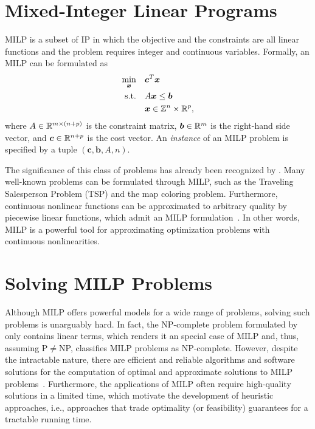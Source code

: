 \section{Mixed-Integer Linear Programs}

MILP is a subset of IP in which the objective and the constraints are all linear functions and the problem requires integer and continuous variables.
Formally, an MILP can be formulated as 
\begin{equation}\label{eq:general-milp}
\begin{split}
    \min_{\bm{x}} \quad & \bm{c}^{T}\bm{x} \\
    \textrm{s.t.} \quad & A\bm{x} \le \bm{b} \\
	  & \bm{x} \in \mathbb{Z}^{n}\times \mathbb{R}^{p}
,\end{split}
\end{equation}
where $A\in \mathbb{R}^{m\times (n+p)}$ is the constraint matrix, $\bm{b}\in \mathbb{R}^{m}$ is the right-hand side vector, and $\bm{c}\in \mathbb{R}^{n+p}$ is the cost vector.
An \emph{instance} of an MILP problem is specified by a tuple  $\left( \bm{c},\bm{b},A,n \right)$.

The significance of this class of problems has already been recognized by .
Many well-known problems can be formulated through MILP, such as the Traveling Salesperson Problem (TSP) and the map coloring problem.
Furthermore, continuous nonlinear functions can be approximated to arbitrary quality by piecewise linear functions, which admit an MILP formulation~\cite{camponogaraModelsAlgorithmsOptimal2015}.
In other words, MILP is a powerful tool for approximating optimization problems with continuous nonlinearities.

\section{Solving MILP Problems}

Although MILP offers powerful models for a wide range of problems, solving such problems is unarguably hard.
In fact, the NP-complete problem formulated by  only contains linear terms, which renders it an special case of MILP and, thus, assuming P$\neq$NP, classifies MILP problems as NP-complete.
However, despite the intractable nature, there are efficient and reliable algorithms and software solutions for the computation of optimal and approximate solutions to MILP problems~\cite{bengioMachineLearningCombinatorial2021}.
Furthermore, the applications of MILP often require high-quality solutions in a limited time, which motivate the development of heuristic approaches, i.e., approaches that trade optimality (or feasibility) guarantees for a tractable running time.

